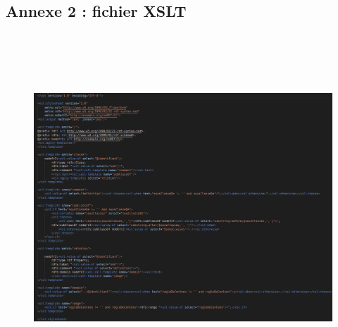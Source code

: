 \documentclass{article}
\begin{document}
\newpage
\subsection{Annexe 2 : fichier XSLT}
\begin{figure}[!ht]
    \includegraphics[scale=0.5,width=16cm, height=13cm]{img/xslt}
\end{figure}

\newpage
\end{document}
